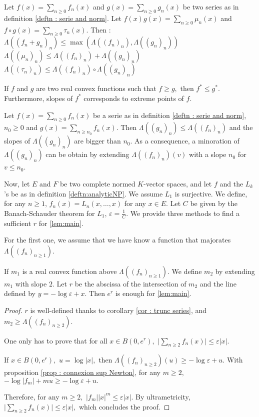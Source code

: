 \documentclass{lms}
\begin{document}
\begin{cor} Let $f(x)= \sum_{n \geq 0} f_n (x)$ and $g(x)= \sum_{n \geq 0} g_n (x)$ be two series as in definition \ref{deftn :  serie and norm}. Let $f(x)g(x)=\sum_{n \geq 0} \mu_n (x) $ and $f \circ g(x)=\sum_{n \geq 0} \tau_n (x) .$ Then :
$\Lambda((f_n+g_n)_n) \leq \max (\Lambda((f_n)_n),\Lambda((g_n)_n))$
$\Lambda((\mu_n)_n) \leq \Lambda((f_n)_n)+\Lambda((g_n)_n)$
$\Lambda((\tau_n)_n) \leq \Lambda((f_n)_n) \circ \Lambda((g_n)_n)$
\end{cor}

\begin{prop} \label{prop : legendre transform}
If $f$ and $g$ are two real convex functions such that $f \geq g,$ then $f^* \leq g^*.$
Furthermore, slopes of $f^*$ corresponds to extreme points of $f$.
\end{prop}

\begin{cor} \label{cor : trunc series}
Let $f(x)= \sum_{n \geq 0} f_n (x)$ be a serie as in definition \ref{deftn :  serie and norm}, $n_0 \geq 0$ and $g(x)= \sum_{n \geq n_0} f_n (x).$ Then $\Lambda((g_n)_n) \leq \Lambda((f_n)_n)$ and the slopes of $\Lambda((g_n)_n)$ are bigger than $n_0$. 
As a consequence, a minoration of $\Lambda((g_n)_n)$ can be obtain by extending $\Lambda((f_n)_n)(v)$ with a slope $n_0$ for $v \leq n_0$.
\end{cor}


Now, let $E$ and $F$ be two complete normed $K$-vector spaces, and let $f$ and the $L_k$'s be as in definition \ref{deftn:analyticNP}. We assume $L_1$ is surjective. We define, for any $n \geq 1$, $f_n(x)=L_n(x,\dots,x)$ for any $x \in E.$ 
Let $C$ be given by the Banach-Schauder theorem for $L_1$, $\varepsilon = \frac{1}{C}$. We provide three methods to find a sufficient $r$ for \ref{lem:main}.

For the first one, we assume that we have know a function that majorates $\Lambda((f_n)_{n \geq 1})$.

\begin{prop} \label{prop : maj Lambda}
If $m_1$ is a real convex function above $\Lambda((f_n)_{n \geq 1})$.
We define $m_2$ by extending $m_1$ with slope $2$.
Let $r$ be the abscissa of the intersection of $m_2$ and the line defined by $y=-\log \varepsilon+ x.$ Then $e^r$ is enough for \ref{lem:main}.
\end{prop}
\begin{proof}
$r$ is well-defined thanks to corollary \ref{cor : trunc series}, and $m_2 \geq \Lambda((f_n)_{n \geq 2}).$

One only has to prove that for all $x \in B(0,e^r),$ $\vert \sum_{n\geq 2} f_n(x) \vert \leq \varepsilon \vert x \vert.$

If $x \in B(0,e^r),$ $u = \log \vert x \vert,$ then $\Lambda((f_n)_{n \geq 2})(u) \geq -\log \varepsilon+ u.$
With proposition \ref{prop : connexion sup Newton}, for any $m \geq 2,$ $-\log \vert f_m \vert +m u \geq -\log \varepsilon+ u.$

Therefore, for any $m \geq 2,$ $\vert f_m \vert  \vert x \vert^m \leq \varepsilon \vert x \vert.$
By ultrametricity,   $\vert \sum_{n\geq 2} f_n(x) \vert \leq \varepsilon \vert x \vert,$ which concludes the proof.
\end{proof}
\end{document}
